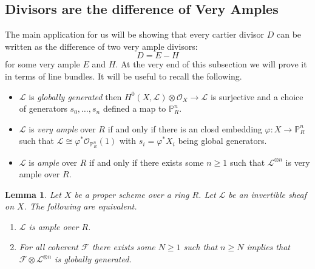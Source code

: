 \documentclass[12pt]{article}
\numberwithin{equation}{section}
\newtheorem{lemma}[theorem]{Lemma}
\theoremstyle{definition}
\theoremstyle{remark}
\newcommand{\Ocal}{\mathcal{O}}
\newcommand{\PP}{\mathbb{P}}
\newcommand{\Lcal}{\mathcal{L}}
\newcommand{\Fcal}{\mathcal{F}}
\begin{document}
\subsection{Divisors are the difference of Very Amples}\label{sec:serre-vanishing-applications}

The main application for us will be showing that every cartier divisor $D$ can be written as the difference of two very ample divisors: 
$$ D = E-H $$
for some very ample $E$ and $H$. 
At the very end of this subsection we will prove it in terms of line bundles. 
It will be useful to recall the following. 
\begin{itemize}
	\item  $\Lcal$ is \emph{globally generated} then $H^0(X,\Lcal)\otimes \Ocal_X \to \Lcal$ is surjective and a choice of generators $s_0,\ldots,s_n$ defined a map to $\PP^n_R$. 
	\item $\Lcal$ is \emph{very ample} over $R$ if and only if there is an closd embedding $\varphi: X\to \PP^n_R$ such that $\Lcal\cong\varphi^*\Ocal_{\PP^n_R}(1)$ with $s_i = \varphi^*X_i$ being global generators. 
	\item $\Lcal$ is \emph{ample} over $R$ if and only if there exists some $n \geq 1$ such that $\Lcal^{\otimes n}$ is very ample over $R$. 
\end{itemize}

\begin{lemma}\label{lem:equivalent-conditions}
	Let $X$ be a proper scheme over a ring $R$.
	Let $\Lcal$ be an invertible sheaf on $X$. 
	The following are equivalent.
	\begin{enumerate}
		\item $\Lcal$ is ample over $R$.
		\item For all coherent $\Fcal$ there exists some $N\geq 1$ such that $n\geq N$ implies that $\Fcal \otimes \Lcal^{\otimes n}$ is globally generated.
	\end{enumerate}
\end{lemma}

\end{document}
